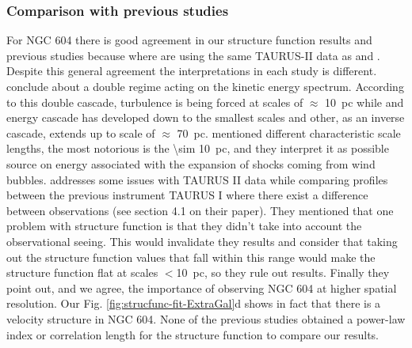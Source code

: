 \documentclass[fleqn,usenatbib, useAMS, a4paper]{mnras}
\begin{document}
\subsubsection{Comparison with previous studies}
\label{sec:comparison-m33}

For NGC 604 there is good agreement in our structure function results and previous studies because where are using the same TAURUS-II data as \citet{Melnick:2021x} and \citet{Medina-Tanco:1997a}.
Despite this general agreement the interpretations in each study is different.
\citet{Medina-Tanco:1997a} conclude about a double regime acting on the kinetic energy spectrum.
According to this double cascade, turbulence is being forced at scales of \(\approx\) \SI{10}{pc} while and energy cascade has developed down to the smallest scales and other, as an inverse cascade, extends up to scale of \(\approx\) \SI{70}{pc}.
\citet{Medina-Tanco:1997a} mentioned different characteristic scale lengths, the most notorious is the \SI{\sim 10}{pc}, and they interpret it as possible source on energy associated with the expansion of shocks coming from wind bubbles.  
\citet{Melnick:2021x} addresses some issues with TAURUS II data while comparing profiles between the previous instrument TAURUS I where there exist a difference between observations (see section 4.1 on their paper).
They mentioned that one problem with \citet{Medina-Tanco:1997a} structure function is that they didn't take into account the observational seeing.
This would invalidate they results and \citet{Melnick:2021x} consider that taking out the structure function values that fall within this range would make the structure function flat at scales \(<\)\SI{10}{pc}, so they rule out \citet{Medina-Tanco:1997a} results.
Finally they point out, and we agree, the importance of observing NGC 604 at higher spatial resolution. 
Our Fig. \ref{fig:strucfunc-fit-ExtraGal}d shows in fact that there is a velocity structure in NGC 604. 
None of the previous studies obtained a power-law index or correlation length for the structure function to compare our results.
\end{document}

